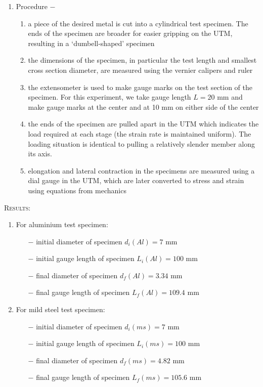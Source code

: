 \documentclass[a4paper, 11pt]{article}
\begin{document}
\begin{enumerate}[label=(\alph*)]
	\item {Procedure} $-$ 
	\begin{enumerate}[label=\roman*)]
		\item a piece of the desired metal is cut into a cylindrical test specimen. The ends of the specimen are broader for easier gripping on the UTM, resulting in a `dumbell-shaped' specimen
		\item the dimensions of the specimen, in particular the test length and smallest cross section diameter, are measured using the vernier calipers and ruler
		\item the extensometer is used to make gauge marks on the test section of the specimen. For this experiment, we take gauge length $L=20$ mm and make gauge marks at the center and at 10 mm on either side of the center
		\item the ends of the specimen are pulled apart in the UTM which indicates the load required at each stage (the strain rate is maintained uniform). The loading situation is identical to pulling a relatively slender member along its axis.
		\item elongation and lateral contraction in the specimens are measured using a dial gauge in the UTM, which are later converted to stress and strain using equations from mechanics
	\end{enumerate}
\end{enumerate}
\newpage
\textsc{Results:}

\begin{enumerate}[label=(\alph*)]
	\item For aluminium test specimen:
\vspace{-3mm}
	
\begin{itemize}
	\itemsep0em
	\item[$-$] initial diameter of specimen $d_i(Al)=7\text{ mm}$
	\item[$-$] initial gauge length of specimen $L_i(Al)=100\text{ mm}$
	\item[$-$] final diameter of specimen $d_f(Al)=3.34\text{ mm}$
	\item[$-$] final gauge length of specimen $L_f(Al)=109.4\text{ mm}$
\end{itemize}
	\item For mild steel test specimen:
\vspace{-3mm}

\begin{itemize}
	\itemsep0em
	\item[$-$] initial diameter of specimen $d_i(ms)=7\text{ mm}$
	\item[$-$] initial gauge length of specimen $L_i(ms)=100\text{ mm}$
	\item[$-$] final diameter of specimen $d_f(ms)=4.82\text{ mm}$
	\item[$-$] final gauge length of specimen $L_f(ms)=105.6\text{ mm}$
\end{itemize}
\end{enumerate}
\end{document}
